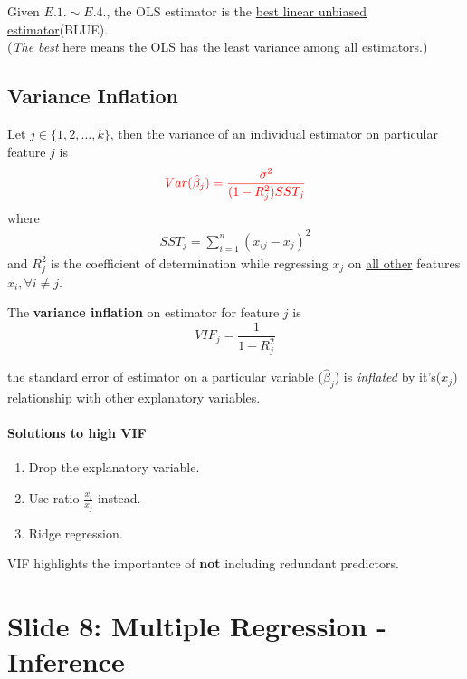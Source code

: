 \documentclass[]{article}
\begin{document}
    	\begin{theorem}
    		Given $E.1. \sim E.4.$, the OLS estimator is the \ul{best linear unbiased estimator}(BLUE). \\(\emph{The best} here means the OLS has the least variance among all estimators.)
    	\end{theorem}
    	
    	\subsection{Variance Inflation}
    	\par Let $j \in \{1, 2, \dots, k\}$, then the variance of an individual estimator on particular feature $j$ is 
    	\[\textcolor{red}{
    		Var(\hat{\beta}_j) = \frac{\sigma^2}{(1-R_j^2)SST_j}
    	}\]
    	where
    	\begin{gather*}
    		SST_j = \sum_{i=1}^n{(x_{ij} - \overline{x}_j)^2}
    	\end{gather*}
    	and $R_j^2$ is the coefficient of determination while regressing $x_j$ on \ul{all other} features $x_i, \forall i \neq j$.
    	\begin{definition}
    		The \textbf{variance inflation} on estimator for feature $j$ is 
    		\[
    			VIF_j = \frac{1}{1-R_j^2}
    		\]
    	\end{definition}
    	\begin{remark}[Interpretation] the standard error of estimator on a particular variable ($\hat{\beta}_j$) is \emph{inflated} by it's($x_j$) relationship with other explanatory variables.
    	\end{remark}	

    	\paragraph{Solutions to high VIF}
    		\begin{enumerate}
    			\item Drop the explanatory variable.
    			\item Use ratio $\frac{x_i}{x_j}$ instead.
    			\item Ridge regression.
    		\end{enumerate}
    	\begin{remark}
    		VIF highlights the importantce of \textbf{not} including redundant predictors.
    	\end{remark}
    	
    \section{Slide 8: Multiple Regression - Inference}
\end{document}
